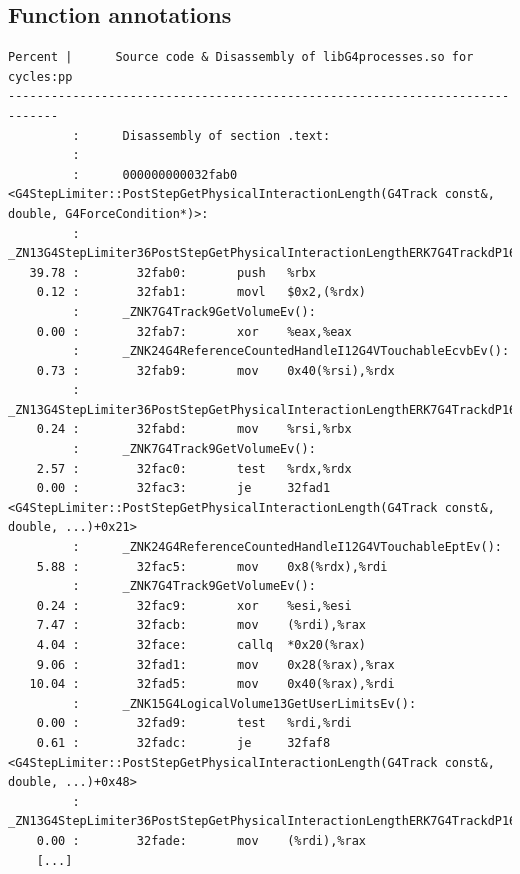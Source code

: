 \documentclass[a4paper]{jpconf}
\begin{document}
\newpage
\newpage
\begin{appendices}

\section{Function annotations}
\begin{lstlisting}[basicstyle=\ttfamily\tiny, 
caption=G4StepLimiter::PostStepGetPhysicalInteractionLength cycles annotation]
Percent |      Source code & Disassembly of libG4processes.so for  cycles:pp
-----------------------------------------------------------------------------
         :      Disassembly of section .text:
         :
         :      000000000032fab0 <G4StepLimiter::PostStepGetPhysicalInteractionLength(G4Track const&, double, G4ForceCondition*)>:
         :      _ZN13G4StepLimiter36PostStepGetPhysicalInteractionLengthERK7G4TrackdP16G4ForceCondition():
   39.78 :        32fab0:       push   %rbx
    0.12 :        32fab1:       movl   $0x2,(%rdx)
         :      _ZNK7G4Track9GetVolumeEv():
    0.00 :        32fab7:       xor    %eax,%eax
         :      _ZNK24G4ReferenceCountedHandleI12G4VTouchableEcvbEv():
    0.73 :        32fab9:       mov    0x40(%rsi),%rdx
         :      _ZN13G4StepLimiter36PostStepGetPhysicalInteractionLengthERK7G4TrackdP16G4ForceCondition():
    0.24 :        32fabd:       mov    %rsi,%rbx
         :      _ZNK7G4Track9GetVolumeEv():
    2.57 :        32fac0:       test   %rdx,%rdx
    0.00 :        32fac3:       je     32fad1 <G4StepLimiter::PostStepGetPhysicalInteractionLength(G4Track const&, double, ...)+0x21>
         :      _ZNK24G4ReferenceCountedHandleI12G4VTouchableEptEv():
    5.88 :        32fac5:       mov    0x8(%rdx),%rdi
         :      _ZNK7G4Track9GetVolumeEv():
    0.24 :        32fac9:       xor    %esi,%esi
    7.47 :        32facb:       mov    (%rdi),%rax
    4.04 :        32face:       callq  *0x20(%rax)
    9.06 :        32fad1:       mov    0x28(%rax),%rax
   10.04 :        32fad5:       mov    0x40(%rax),%rdi
         :      _ZNK15G4LogicalVolume13GetUserLimitsEv():
    0.00 :        32fad9:       test   %rdi,%rdi
    0.61 :        32fadc:       je     32faf8 <G4StepLimiter::PostStepGetPhysicalInteractionLength(G4Track const&, double, ...)+0x48>
         :      _ZN13G4StepLimiter36PostStepGetPhysicalInteractionLengthERK7G4TrackdP16G4ForceCondition():
    0.00 :        32fade:       mov    (%rdi),%rax
    [...]
\end{lstlisting}


\end{appendices}
\end{document}
